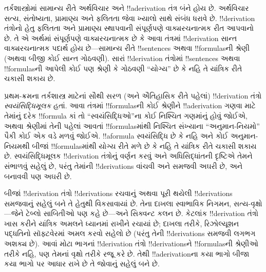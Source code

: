 \documentclass[../../../include/open-logic-section]{subfiles}
\begin{document}
      {}
      {}


તર્કશાસ્ત્રોમાં સામાન્ય રીતે અર્થવિચાર અને !!a{derivation} તંત્ર બંને
હોય છે. અર્થવિચાર સત્ય, સંતોષ્યતા, પ્રામાણ્ય અને ફલિતતા જેવા ખ્યાલો
સાથે સંબંધ ધરાવે છે. !!{derivation} તંત્રોનો હેતુ ફલિતતા અને
પ્રામાણ્ય સ્થાપવાની સંપૂર્ણપણે વાક્યરચનાત્મક રીત આપવાનો છે. તે એ
અર્થમાં સંપૂર્ણપણે વાક્યરચનાત્મક છે કે આવા તંત્રમાં !!{derivation}
સાન્ત વાક્યરચનાત્મક પદાર્થ હોય છે—સામાન્ય રીતે !!{sentence}s અથવા
!!{formula}sની શ્રેણી (અથવા બીજી કોઈ સાન્ત ગોઠવણી). સારાં
!!{derivation} તંત્રોમાં !!{sentence}s અથવા !!{formula}sની આપેલી કોઈ
પણ શ્રેણી કે ગોઠવણી ``યોગ્ય'' છે કે નહિ તે યાંત્રિક રીતે ચકાસી શકાય છે.

પ્રથમ-ક્રમના તર્કશાસ્ત્ર માટેનાં સૌથી સરળ (અને ઐતિહાસિક રીતે પહેલાં)
!!{derivation} તંત્રો \emph{સ્વયંસિદ્ધિમૂલક} હતાં. આવા તંત્રમાં
!!{formula}sની કોઈ શ્રેણીને !!a{derivation} ગણવા માટે તેમાંનું દરેક
!!{formula} કાં તો ``સ્વયંસિદ્ધિઓ''ના કોઈ નિશ્ચિત ગણમાંનું હોવું જોઈએ,
અથવા શ્રેણીમાં તેની પહેલાં આવતાં !!{formula}sમાંથી નિશ્ચિત સંખ્યાના
``અનુમાન-નિયમો'' પૈકી કોઈ એક વડે મળવું જોઈએ. !!a{formula}
સ્વયંસિદ્ધિ છે કે નહિ અને કોઈ અનુમાન-નિયમથી બીજાં !!{formula}sમાંથી
યોગ્ય રીતે મળે છે કે નહિ તે યાંત્રિક રીતે ચકાસી શકાય છે.
સ્વયંસિદ્ધિમૂલક !!{derivation} તંત્રોનું વર્ણન કરવું અને
અધિસિદ્ધાંતની દૃષ્ટિએ તેમને સંભાળવું સહેલું છે, પરંતુ તેમાંની
!!{derivation}s વાંચવી અને સમજવી અઘરી છે, અને બનાવવી પણ અઘરી છે.

બીજાં !!{derivation} તંત્રો !!{derivation}s રચવાનું અથવા પૂરી થયેલી
!!{derivation}s સમજવાનું સહેલું બને તે હેતુથી વિકસાવાયાં છે. તેના
દાખલા સ્વાભાવિક નિગમન, સત્ય-વૃક્ષો—જેને ટેબ્લો સાબિતીઓ પણ કહે
છે—અને સિક્વન્ટ કલન છે. કેટલાંક !!{derivation} તંત્રો ખાસ કરીને
યાંત્રિક અમલને ધ્યાનમાં રાખીને રચાયાં છે; દાખલા તરીકે, રિઝોલ્યૂશન
પદ્ધતિનો સૉફ્ટવેરમાં અમલ કરવો સહેલો છે (પરંતુ તેની !!{derivation}s
સમજવી લગભગ અશક્ય છે). આવાં મોટા ભાગનાં !!{derivation} તંત્રો
!!{derivation}sને !!{formula}sની
શ્રેણીઓ તરીકે નહિ, પણ તેમનાં વૃક્ષો તરીકે રજૂ કરે છે.
તેથી !!a{derivation}ના કયા ભાગો બીજા કયા ભાગો પર આધાર રાખે છે તે
જોવાનું સહેલું બને છે.
\end{document}
